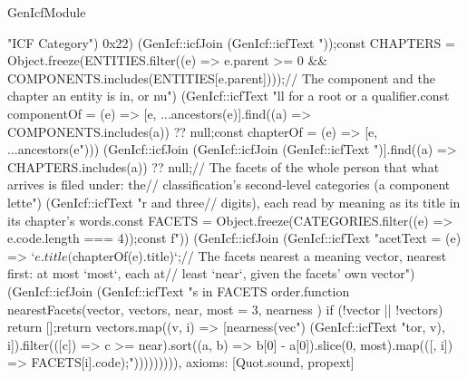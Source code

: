\begin{lexlean}{GenIcfModule}
\begin{semanticmodule}
{"ICF Category") 0x22) (GenIcf::icfJoin (GenIcf::icfText "));\nexport const CHAPTERS = Object.freeze(ENTITIES.filter((e) => e.parent >= 0 && COMPONENTS.includes(ENTITIES[e.parent])));\n// The component and the chapter an entity is in, or nu") (GenIcf::icfText "ll for a root or a qualifier.\nexport const componentOf = (e) => [e, ...ancestors(e)].find((a) => COMPONENTS.includes(a)) ?? null;\nexport const chapterOf = (e) => [e, ...ancestors(e"))) (GenIcf::icfJoin (GenIcf::icfJoin (GenIcf::icfText ")].find((a) => CHAPTERS.includes(a)) ?? null;\n// The facets of the whole person that what arrives is filed under: the\n// classification's second-level categories (a component lette") (GenIcf::icfText "r and three\n// digits), each read by meaning as its title in its chapter's words.\nexport const FACETS = Object.freeze(CATEGORIES.filter((e) => e.code.length === 4));\nexport const f")) (GenIcf::icfJoin (GenIcf::icfText "acetText = (e) => `${e.title} (${chapterOf(e).title})`;\n// The facets nearest a meaning vector, nearest first: at most `most`, each at\n// least `near`, given the facets' own vector") (GenIcf::icfJoin (GenIcf::icfText "s in FACETS order.\nexport function nearestFacets(vector, vectors, { near, most = 3, nearness }) {\n  if (!vector || !vectors) return [];\n  return vectors.map((v, i) => [nearness(vec") (GenIcf::icfText "tor, v), i]).filter(([c]) => c >= near).sort((a, b) => b[0] - a[0]).slice(0, most).map(([, i]) => FACETS[i].code);\n}\n"))))))))),
  axioms: [Quot.sound, propext]
}
\end{semanticmodule}
\end{lexlean}
